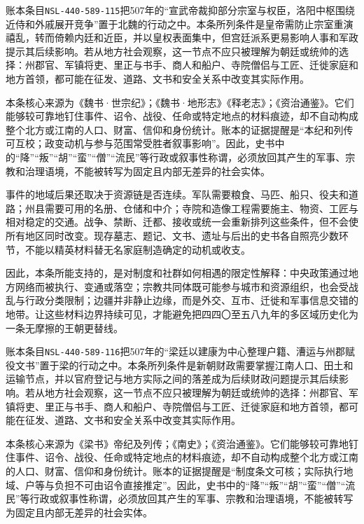 账本条目\texttt{NSL-440-589-115}把507年的“宣武帝裁抑部分宗室与权臣，洛阳中枢围绕近侍和外戚展开竞争”置于北魏的行动之中。本条所列条件是皇帝需防止宗室重演禧乱，转而倚赖内廷和近臣，并以皇权表面集中，但宫廷派系更易影响人事和军政提示其后续影响。若从地方社会观察，这一节点不应只被理解为朝廷或统帅的选择：州郡官、军镇将吏、里正与书手、商人和船户、寺院僧侣与工匠、迁徙家庭和地方首领，都可能在征发、道路、文书和安全关系中改变其实际作用。

本条核心来源为《魏书·世宗纪》；《魏书·地形志》《释老志》；《资治通鉴》。它们能够较可靠地钉住事件、诏令、战役、任命或特定地点的材料痕迹，却不自动构成整个北方或江南的人口、财富、信仰和身份统计。账本的证据提醒是“本纪和列传可互校；政变动机与参与范围常受胜者叙事影响”。因此，史书中的“降”“叛”“胡”“蛮”“僧”“流民”等行政或叙事性称谓，必须放回其产生的军事、宗教和治理语境，不能被转写为固定且内部无差异的社会实体。

事件的地域后果还取决于资源链是否连续。军队需要粮食、马匹、船只、役夫和道路；州县需要可用的名册、仓储和中介；寺院和造像工程需要施主、物资、工匠与相对稳定的交通。战争、禁断、迁都、接收或统一会重新排列这些条件，但不会使所有地区同时改变。现存墓志、题记、文书、遗址与后出的史书各自照亮少数环节，不能以精英材料替无名家庭制造确定的动机或收支。

因此，本条所能支持的，是对制度和社群如何相遇的限定性解释：中央政策通过地方网络而被执行、变通或落空；宗教共同体既可能参与城市和资源组织，也会受战乱与行政分类限制；边疆并非静止边缘，而是外交、互市、迁徙和军事信息交错的地带。让这些材料边界持续可见，才能避免把四四〇至五八九年的多区域历史化为一条无摩擦的王朝更替线。

账本条目\texttt{NSL-440-589-116}把507年的“梁廷以建康为中心整理户籍、漕运与州郡赋役文书”置于梁的行动之中。本条所列条件是新朝财政需要掌握江南人口、田土和运输节点，并以官府登记与地方实际之间的落差成为后续财政问题提示其后续影响。若从地方社会观察，这一节点不应只被理解为朝廷或统帅的选择：州郡官、军镇将吏、里正与书手、商人和船户、寺院僧侣与工匠、迁徙家庭和地方首领，都可能在征发、道路、文书和安全关系中改变其实际作用。

本条核心来源为《梁书》帝纪及列传；《南史》；《资治通鉴》。它们能够较可靠地钉住事件、诏令、战役、任命或特定地点的材料痕迹，却不自动构成整个北方或江南的人口、财富、信仰和身份统计。账本的证据提醒是“制度条文可核；实际执行地域、户等与负担不可由诏令直接推定”。因此，史书中的“降”“叛”“胡”“蛮”“僧”“流民”等行政或叙事性称谓，必须放回其产生的军事、宗教和治理语境，不能被转写为固定且内部无差异的社会实体。

